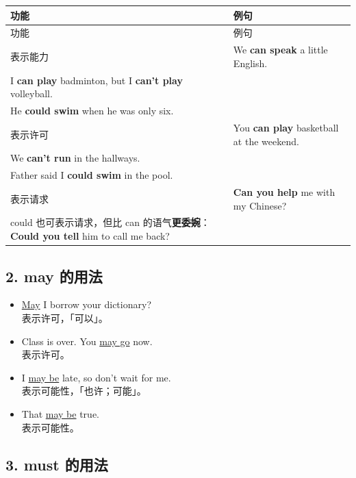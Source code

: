 \documentclass[11pt,a4paper]{ctexart}
\begin{document}
{\footnotesize
\begin{longtable}{p{6.70cm}p{6.70cm}}
\hline
功能 & 例句 \\
\hline
\endfirsthead
\hline
功能 & 例句 \\
\hline
\endhead
\hline
\endfoot
表示能力 & We \textbf{can speak} a little English.\\ I \textbf{can play} badminton, but I \textbf{can’t play} volleyball.\\ He \textbf{could swim} when he was only six. \\
表示许可 & You \textbf{can play} basketball at the weekend.\\ We \textbf{can’t run} in the hallways.\\ Father said I \textbf{could swim} in the pool. \\
表示请求 & \textbf{Can you help} me with my Chinese?\\ could 也可表示请求，但比 can 的语气\textbf{更委婉}：\textbf{Could you tell} him to call me back? \\
\end{longtable}
}

\subsection*{2. may 的用法}

\begin{itemize}[leftmargin=1.4em]
\item \underline{May} I borrow your dictionary?\\ 表示许可，「可以」。
\item Class is over. You \underline{may go} now.\\ 表示许可。
\item I \underline{may be} late, so don’t wait for me.\\ 表示可能性，「也许；可能」。
\item That \underline{may be} true.\\ 表示可能性。
\end{itemize}

\begin{center}\end{center}

\subsection*{3. must 的用法}
\end{document}
